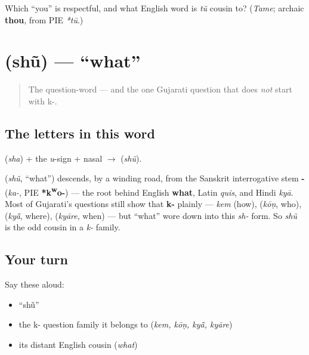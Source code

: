 \begin{tcolorbox}[breakable,colback=teal!4,colframe=teal!35!black,title={Before you move on}]
Which \textquotedblleft{}you\textquotedblright{} is respectful, and what English word is \emph{tũ} cousin to? (\emph{Tame}; archaic \textbf{thou}, from PIE \emph{*tū}.)
\end{tcolorbox}
\section[\gu{શું}]{ (shũ) — \textquotedblleft{}what\textquotedblright{}}

\label{lesson:GU-C02-shun}



\begin{quote}
The question-word — and the one Gujarati question that does \emph{not} start with k-.
\end{quote}

\subsection*{The letters in this word}
\textbf{} (\emph{sha}) + the \emph{u}-sign + nasal $\to$ \textbf{} (\emph{shũ}).

\begin{cousinweb}
\textbf{} (\emph{shũ}, \textquotedblleft{}what\textquotedblright{}) descends, by a winding road, from the Sanskrit interrogative stem \textbf{-} (\emph{ka-}, PIE \textbf{*k\textsuperscript{w}o-}) — the root behind English \textbf{what}, Latin \emph{quis}, and Hindi \emph{kyā}. Most of Gujarati's questions still show that \textbf{k-} plainly — \emph{kem} (how), \textbf{} (\emph{kōṇ}, who), \textbf{} (\emph{kyā̃}, where), \textbf{} (\emph{kyāre}, when) — but \textquotedblleft{}what\textquotedblright{} wore down into this \emph{sh-} form. So \emph{shũ} is the odd cousin in a \emph{k-} family.
\end{cousinweb}

\subsection*{Your turn}
Say these aloud:

\begin{itemize}
\raggedright
  \item \textquotedblleft{}shũ\textquotedblright{}
  \item the k- question family it belongs to (\emph{kem, kōṇ, kyā̃, kyāre})
  \item its distant English cousin (\emph{what})
\end{itemize}

